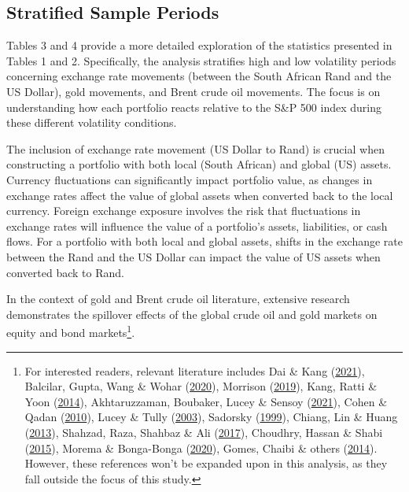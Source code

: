 \documentclass[12pt,preprint, authoryear]{elsarticle}
\numberwithin{equation}{section}
\numberwithin{figure}{section}
\numberwithin{table}{section}
\let\rmarkdownfootnote\footnote%
\def\footnote{\protect\rmarkdownfootnote}
\begin{document}
\hypertarget{stratified-sample-periods}{%
\subsection{Stratified Sample Periods}\label{stratified-sample-periods}}

Tables 3 and 4 provide a more detailed exploration of the statistics
presented in Tables 1 and 2. Specifically, the analysis stratifies high
and low volatility periods concerning exchange rate movements (between
the South African Rand and the US Dollar), gold movements, and Brent
crude oil movements. The focus is on understanding how each portfolio
reacts relative to the S\&P 500 index during these different volatility
conditions.

The inclusion of exchange rate movement (US Dollar to Rand) is crucial
when constructing a portfolio with both local (South African) and global
(US) assets. Currency fluctuations can significantly impact portfolio
value, as changes in exchange rates affect the value of global assets
when converted back to the local currency. Foreign exchange exposure
involves the risk that fluctuations in exchange rates will influence the
value of a portfolio's assets, liabilities, or cash flows. For a
portfolio with both local and global assets, shifts in the exchange rate
between the Rand and the US Dollar can impact the value of US assets
when converted back to Rand.

In the context of gold and Brent crude oil literature, extensive
research demonstrates the spillover effects of the global crude oil and
gold markets on equity and bond markets\footnote{For interested readers,
  relevant literature includes Dai \& Kang
  (\protect\hyperlink{ref-dai2021bond}{2021}), Balcilar, Gupta, Wang \&
  Wohar (\protect\hyperlink{ref-balcilar2020oil}{2020}), Morrison
  (\protect\hyperlink{ref-morrison2019energy}{2019}), Kang, Ratti \&
  Yoon (\protect\hyperlink{ref-kang2014impact}{2014}), Akhtaruzzaman,
  Boubaker, Lucey \& Sensoy
  (\protect\hyperlink{ref-akhtaruzzaman2021gold}{2021}), Cohen \& Qadan
  (\protect\hyperlink{ref-cohen2010gold}{2010}), Lucey \& Tully
  (\protect\hyperlink{ref-lucey2003international}{2003}), Sadorsky
  (\protect\hyperlink{ref-sadorsky1999oil}{1999}), Chiang, Lin \& Huang
  (\protect\hyperlink{ref-chiang2013relationships}{2013}), Shahzad,
  Raza, Shahbaz \& Ali
  (\protect\hyperlink{ref-shahzad2017dependence}{2017}), Choudhry,
  Hassan \& Shabi
  (\protect\hyperlink{ref-choudhry2015relationship}{2015}), Morema \&
  Bonga-Bonga (\protect\hyperlink{ref-morema2020impact}{2020}), Gomes,
  Chaibi \& others (\protect\hyperlink{ref-gomes2014volatility}{2014}).
  However, these references won't be expanded upon in this analysis, as
  they fall outside the focus of this study.}.
\end{document}
